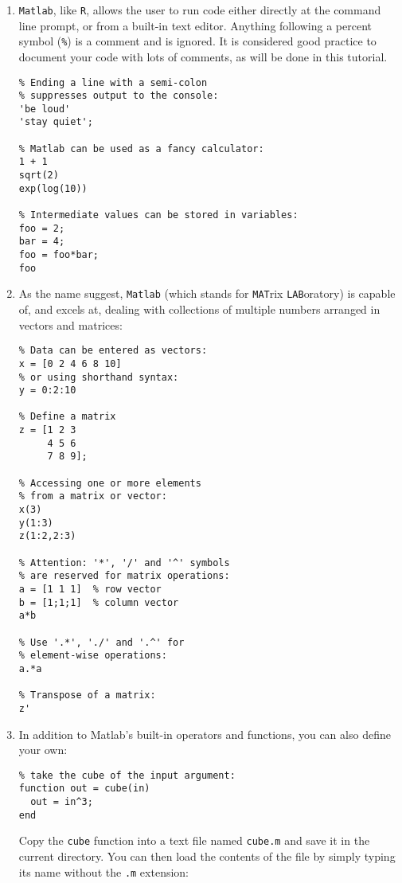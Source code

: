 \documentclass{book}
\begin{document}
\begin{enumerate}
\item \texttt{Matlab}, like \texttt{R}, allows the user to run code
  either directly at the command line prompt, or from a built-in text
  editor. Anything following a percent symbol (\texttt{\%}) is a
  comment and is ignored. It is considered good practice to document
  your code with lots of comments, as will be done in this tutorial.
  
\begin{verbatim}
% Ending a line with a semi-colon 
% suppresses output to the console:
'be loud'
'stay quiet';

% Matlab can be used as a fancy calculator:
1 + 1
sqrt(2)
exp(log(10))

% Intermediate values can be stored in variables:
foo = 2;
bar = 4;
foo = foo*bar;
foo
\end{verbatim}

\item As the name suggest, \texttt{Matlab} (which stands for
  \texttt{MAT}rix \texttt{LAB}oratory) is capable of, and excels at,
  dealing with collections of multiple numbers arranged in vectors and
  matrices:

\begin{verbatim}
% Data can be entered as vectors:
x = [0 2 4 6 8 10]
% or using shorthand syntax:
y = 0:2:10

% Define a matrix
z = [1 2 3
     4 5 6
     7 8 9];

% Accessing one or more elements 
% from a matrix or vector:
x(3)
y(1:3)
z(1:2,2:3)

% Attention: '*', '/' and '^' symbols
% are reserved for matrix operations:
a = [1 1 1]  % row vector
b = [1;1;1]  % column vector
a*b

% Use '.*', './' and '.^' for 
% element-wise operations:
a.*a

% Transpose of a matrix:
z'
\end{verbatim}

\item In addition to Matlab's built-in operators and functions, you
  can also define your own:
  
\begin{verbatim}
% take the cube of the input argument:
function out = cube(in)
  out = in^3;
end
\end{verbatim}

Copy the \texttt{cube} function into a text file named \texttt{cube.m}
and save it in the current directory. You can then load the contents
of the file by simply typing its name without the \texttt{.m}
extension:


\end{enumerate}
\end{document}
